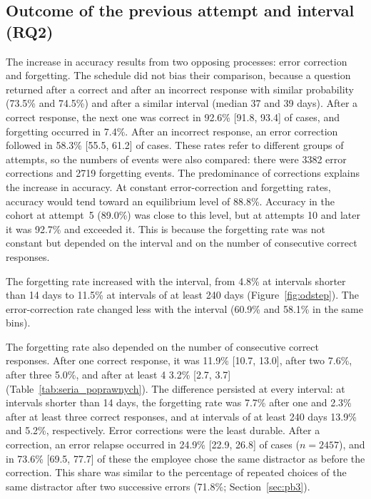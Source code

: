 \documentclass[11pt]{article}
\newcommand{\ReaskAfterCorrect}{73.5}
\newcommand{\ReaskAfterIncorrect}{74.5}
\newcommand{\GapAfterCorrect}{37}
\newcommand{\GapAfterIncorrect}{39}
\newcommand{\AccAttMax}{92.7}
\newcommand{\AttMax}{10}
\newcommand{\CohortK}{5}
\newcommand{\CohortAccK}{89.0}
\newcommand{\NCorrections}{3382}
\newcommand{\NForgetting}{2719}
\newcommand{\EquilibriumPct}{88.8}
\newcommand{\RetainPct}{92.6}
\newcommand{\RetainCI}{[91.8, 93.4]}
\newcommand{\ForgetPct}{7.4}
\newcommand{\RecoverPct}{58.3}
\newcommand{\RecoverCI}{[55.5, 61.2]}
\newcommand{\SameDistractorPct}{71.8}
\newcommand{\RetShortIncorrect}{60.9}
\newcommand{\RetLongIncorrect}{58.1}
\newcommand{\ForgetShort}{4.8}
\newcommand{\ForgetLong}{11.5}
\newcommand{\ForgetRunOne}{11.9}
\newcommand{\ForgetRunOneCI}{[10.7, 13.0]}
\newcommand{\ForgetRunTwo}{7.6}
\newcommand{\ForgetRunThree}{5.0}
\newcommand{\ForgetRunMax}{3.2}
\newcommand{\ForgetRunMaxCI}{[2.7, 3.7]}
\newcommand{\ForgetFreshShort}{7.7}
\newcommand{\ForgetFreshLong}{13.9}
\newcommand{\ForgetStableShort}{2.3}
\newcommand{\ForgetStableLong}{5.2}
\newcommand{\RelapsePct}{24.9}
\newcommand{\RelapseCI}{[22.9, 26.8]}
\newcommand{\RelapseN}{2457}
\newcommand{\RelapseSamePct}{73.6}
\newcommand{\RelapseSameCI}{[69.5, 77.7]}
\newcommand{\ForgetRunK}{4}
\begin{document}
\subsection{Outcome of the previous attempt and interval (RQ2)}
The increase in accuracy results from two opposing processes: error correction and forgetting. The
schedule did not bias their comparison, because a question returned after a correct and after an
incorrect response with similar probability (\ReaskAfterCorrect\% and \ReaskAfterIncorrect\%) and
after a similar interval (median \GapAfterCorrect{} and \GapAfterIncorrect{} days). After a correct
response, the next one was correct in \RetainPct\% \RetainCI{} of cases, and forgetting occurred in
\ForgetPct\%. After an incorrect response, an error correction followed in \RecoverPct\%
\RecoverCI{} of cases. These rates refer to different groups of attempts, so the numbers of events were
also compared: there were \NCorrections{} error corrections and \NForgetting{} forgetting events. The
predominance of corrections explains the increase in accuracy. At constant error-correction and
forgetting rates, accuracy would tend toward an equilibrium level of \EquilibriumPct\%. Accuracy in the
cohort at attempt~\CohortK{} (\CohortAccK\%) was close to this level, but at attempts \AttMax{} and
later it was \AccAttMax\% and exceeded it. This is because the forgetting rate was not constant but
depended on the interval and on the number of consecutive correct responses.

The forgetting rate increased with the interval, from \ForgetShort\% at intervals shorter than 14 days
to \ForgetLong\% at intervals of at least 240 days (Figure~\ref{fig:odstep}). The error-correction
rate changed less with the interval (\RetShortIncorrect\% and \RetLongIncorrect\% in the same bins).

The forgetting rate also depended on the number of consecutive correct responses. After one correct
response, it was \ForgetRunOne\% \ForgetRunOneCI, after two \ForgetRunTwo\%, after three
\ForgetRunThree\%, and after at least \ForgetRunK{} \ForgetRunMax\% \ForgetRunMaxCI{}
(Table~\ref{tab:seria_poprawnych}). The difference persisted at every interval: at intervals shorter
than 14 days, the forgetting rate was \ForgetFreshShort\% after one and \ForgetStableShort\% after at
least three correct responses, and at intervals of at least 240 days \ForgetFreshLong\% and
\ForgetStableLong\%, respectively. Error corrections were the least durable. After a correction, an
error relapse occurred in \RelapsePct\% \RelapseCI{} of cases ($n = \RelapseN$), and in
\RelapseSamePct\% \RelapseSameCI{} of these the employee chose the same distractor as before the
correction. This share was similar to the percentage of repeated choices of the same distractor after
two successive errors (\SameDistractorPct\%; Section~\ref{sec:pb3}).
\end{document}
